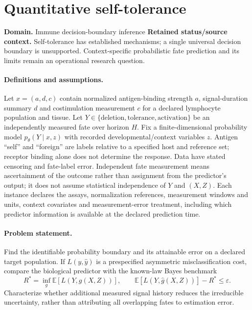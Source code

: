 \documentclass[11pt]{article}
\begin{document}
\section*{Quantitative self-tolerance}
\label{prob:234}
\label{rank:35}
\par\smallskip

\noindent\textbf{Domain.} Immune decision-boundary inference \quad \textbf{Retained status/source context.} Self-tolerance has established mechanisms; a single universal decision boundary is unsupported. Context-specific probabilistic fate prediction and its limits remain an operational research question.
\paragraph{Definitions and assumptions.} Let $x=(a,d,c)$ contain normalized antigen-binding strength $a$, signal-duration summary $d$ and costimulation measurement $c$ for a declared lymphocyte population and tissue. Let $Y\in\{\mathrm{deletion},\mathrm{tolerance},\mathrm{activation}\}$ be an independently measured fate over horizon $H$. Fix a finite-dimensional probability model $p_\theta(Y\mid x,z)$ with recorded developmental/context variables $z$. Antigen ``self'' and ``foreign'' are labels relative to a specified host and reference set; receptor binding alone does not determine the response. Data have stated censoring and fate-label error. Independent fate measurement means ascertainment of the outcome rather than assignment from the predictor's output; it does not assume statistical independence of $Y$ and $(X,Z)$. Each instance declares the assays, normalization references, measurement windows and units, context covariates and measurement-error treatment, including which predictor information is available at the declared prediction time.
\paragraph{Problem statement.} Find the identifiable probability boundary and its attainable error on a declared target population. If $L(y,\widehat y)$ is a prespecified asymmetric misclassification cost, compare the biological predictor with the known-law Bayes benchmark
    \[R^*=\inf_g\mathbb{E}[L(Y,g(X,Z))],\qquad
    \mathbb{E}[L(Y,\widehat g(X,Z))]-R^*\leq\varepsilon.\]
    Characterize whether additional measured signal history reduces the irreducible uncertainty, rather than attributing all overlapping fates to estimation error.
\end{document}
